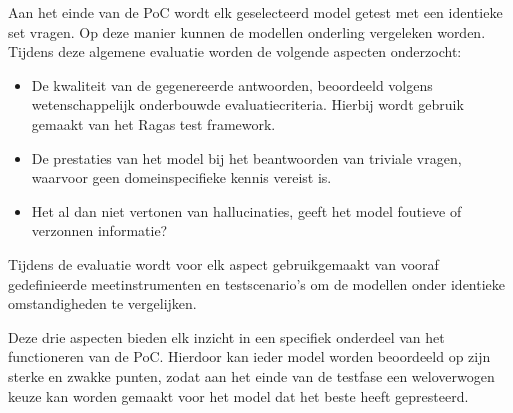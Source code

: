 Aan het einde van de PoC wordt elk geselecteerd model getest met een identieke set vragen. Op deze manier kunnen de modellen onderling vergeleken worden. Tijdens deze algemene evaluatie worden de volgende aspecten onderzocht:

\begin{itemize}
    \item De kwaliteit van de gegenereerde antwoorden, beoordeeld volgens wetenschappelijk onderbouwde evaluatiecriteria. Hierbij wordt gebruik gemaakt van het Ragas test framework.
    \item De prestaties van het model bij het beantwoorden van triviale vragen, waarvoor geen domeinspecifieke kennis vereist is.
    \item Het al dan niet vertonen van hallucinaties, geeft het model foutieve of verzonnen informatie?
\end{itemize}

Tijdens de evaluatie wordt voor elk aspect gebruikgemaakt van vooraf gedefinieerde meetinstrumenten en testscenario’s om de modellen onder identieke omstandigheden te vergelijken.

Deze drie aspecten bieden elk inzicht in een specifiek onderdeel van het functioneren van de PoC. Hierdoor kan ieder model worden beoordeeld op zijn sterke en zwakke punten, zodat aan het einde van de testfase een weloverwogen keuze kan worden gemaakt voor het model dat het beste heeft gepresteerd.

